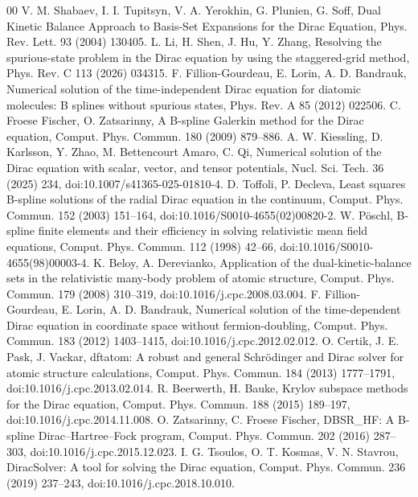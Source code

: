 \documentclass[a4paper,fleqn]{cas-dc}
\begin{document}
\begin{thebibliography}{00}
 V. M. Shabaev, I. I. Tupitsyn, V. A. Yerokhin, G. Plunien, G. Soff, Dual Kinetic Balance Approach to Basis-Set Expansions for the Dirac Equation, Phys. Rev. Lett. 93 (2004) 130405.
 L. Li, H. Shen, J. Hu, Y. Zhang, Resolving the spurious-state problem in the Dirac equation by using the staggered-grid method, Phys. Rev. C 113 (2026) 034315.
 F. Fillion-Gourdeau, E. Lorin, A. D. Bandrauk, Numerical solution of the time-independent Dirac equation for diatomic molecules: B splines without spurious states, Phys. Rev. A 85 (2012) 022506.
 C. Froese Fischer, O. Zatsarinny, A B-spline Galerkin method for the Dirac equation, Comput. Phys. Commun. 180 (2009) 879--886.
 A. W. Kiessling, D. Karlsson, Y. Zhao, M. Bettencourt Amaro, C. Qi, Numerical solution of the Dirac equation with scalar, vector, and tensor potentials, Nucl. Sci. Tech. 36 (2025) 234, doi:10.1007/s41365-025-01810-4.
 D. Toffoli, P. Decleva, Least squares B-spline solutions of the radial Dirac equation in the continuum, Comput. Phys. Commun. 152 (2003) 151--164, doi:10.1016/S0010-4655(02)00820-2.
 W. P\"oschl, B-spline finite elements and their efficiency in solving relativistic mean field equations, Comput. Phys. Commun. 112 (1998) 42--66, doi:10.1016/S0010-4655(98)00003-4.
 K. Beloy, A. Derevianko, Application of the dual-kinetic-balance sets in the relativistic many-body problem of atomic structure, Comput. Phys. Commun. 179 (2008) 310--319, doi:10.1016/j.cpc.2008.03.004.
 F. Fillion-Gourdeau, E. Lorin, A. D. Bandrauk, Numerical solution of the time-dependent Dirac equation in coordinate space without fermion-doubling, Comput. Phys. Commun. 183 (2012) 1403--1415, doi:10.1016/j.cpc.2012.02.012.
 O. Certik, J. E. Pask, J. Vackar, dftatom: A robust and general Schr\"odinger and Dirac solver for atomic structure calculations, Comput. Phys. Commun. 184 (2013) 1777--1791, doi:10.1016/j.cpc.2013.02.014.
 R. Beerwerth, H. Bauke, Krylov subspace methods for the Dirac equation, Comput. Phys. Commun. 188 (2015) 189--197, doi:10.1016/j.cpc.2014.11.008.
 O. Zatsarinny, C. Froese Fischer, DBSR\_HF: A B-spline Dirac--Hartree--Fock program, Comput. Phys. Commun. 202 (2016) 287--303, doi:10.1016/j.cpc.2015.12.023.
 I. G. Tsoulos, O. T. Kosmas, V. N. Stavrou, DiracSolver: A tool for solving the Dirac equation, Comput. Phys. Commun. 236 (2019) 237--243, doi:10.1016/j.cpc.2018.10.010.

\end{thebibliography}
\end{document}
